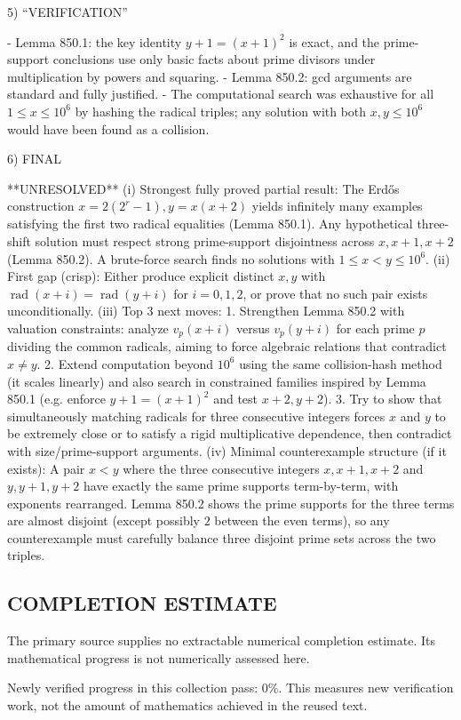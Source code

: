 5) “VERIFICATION”

- Lemma 850.1: the key identity $y+1=(x+1)^2$ is exact, and the prime-support conclusions use only basic facts about prime divisors under multiplication by powers and squaring.
- Lemma 850.2: gcd arguments are standard and fully justified.
- The computational search was exhaustive for all $1\le x\le 10^6$ by hashing the radical triples; any solution with both $x,y\le 10^6$ would have been found as a collision.

6) FINAL

**UNRESOLVED**
(i) Strongest fully proved partial result: The Erd\H{o}s construction $x=2(2^r-1),y=x(x+2)$ yields infinitely many examples satisfying the first two radical equalities (Lemma 850.1). Any hypothetical three-shift solution must respect strong prime-support disjointness across $x,x+1,x+2$ (Lemma 850.2). A brute-force search finds no solutions with $1\le x<y\le 10^6$.
(ii) First gap (crisp): Either produce explicit distinct $x,y$ with $\operatorname{rad}(x+i)=\operatorname{rad}(y+i)$ for $i=0,1,2$, or prove that no such pair exists unconditionally.
(iii) Top 3 next moves:
  1. Strengthen Lemma 850.2 with valuation constraints: analyze $v_p(x+i)$ versus $v_p(y+i)$ for each prime $p$ dividing the common radicals, aiming to force algebraic relations that contradict $x\ne y$.
  2. Extend computation beyond $10^6$ using the same collision-hash method (it scales linearly) and also search in constrained families inspired by Lemma 850.1 (e.g. enforce $y+1=(x+1)^2$ and test $x+2,y+2$).
  3. Try to show that simultaneously matching radicals for three consecutive integers forces $x$ and $y$ to be extremely close or to satisfy a rigid multiplicative dependence, then contradict with size/prime-support arguments.
(iv) Minimal counterexample structure (if it exists): A pair $x<y$ where the three consecutive integers $x,x+1,x+2$ and $y,y+1,y+2$ have exactly the same prime supports term-by-term, with exponents rearranged. Lemma 850.2 shows the prime supports for the three terms are almost disjoint (except possibly $2$ between the even terms), so any counterexample must carefully balance three disjoint prime sets across the two triples.




\subsection*{COMPLETION ESTIMATE}
The primary source supplies no extractable numerical completion estimate. Its mathematical progress is not numerically assessed here.

Newly verified progress in this collection pass: $0\%$. This measures new verification work, not the amount of mathematics achieved in the reused text.
